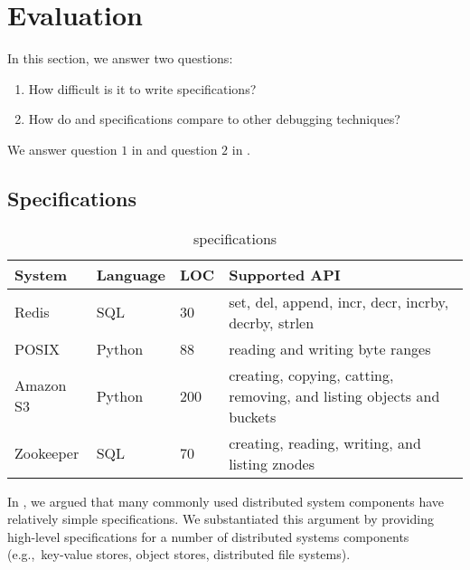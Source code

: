 \section{Evaluation}

In this section, we answer two questions:
\begin{enumerate}
  \item
    How difficult is it to write \watprovenance{} specifications?

  \item
    How do \watprovenance{} and \watprovenance{} specifications compare to
    other debugging techniques?
\end{enumerate}
We answer question $1$ in  and question $2$ in
.

\subsection{\WatProvenance{} Specifications}
\begin{table}[t]
  \caption{\fluent{} \watprovenance{} specifications}
  \begin{tabular}{lllp{3cm}}
    \toprule
    System    & Language & LOC & Supported API                                                         \\\midrule
    Redis     & SQL      & 30  & set, del, append, incr, decr, incrby, decrby, strlen                  \\
    POSIX     & Python   & 88  & reading and writing byte ranges                                       \\
    Amazon S3 & Python   & 200 & creating, copying, catting, removing, and listing objects and buckets \\
    Zookeeper & SQL      & 70  & creating, reading, writing, and listing znodes                        \\
    \bottomrule
  \end{tabular}
\end{table}

In , we argued that many commonly used distributed system
components have relatively simple \watprovenance{} specifications. We
substantiated this argument by providing high-level \watprovenance{}
specifications for a number of distributed systems components (e.g.,\ key-value
stores, object stores, distributed file systems).

